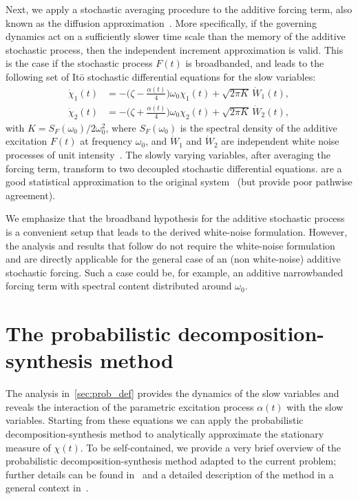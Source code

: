 \documentclass[3p]{elsarticle}
\begin{document}
Next, we apply a stochastic averaging procedure to the additive forcing term, also known as the diffusion approximation~\cite{Lin_Cai95, Klyatskin05, sapsis_PEM11}. More specifically, if the governing dynamics  act on a sufficiently slower time scale than the memory of the additive stochastic process, then the independent increment approximation is valid. This is the case if the stochastic process $F(t)$ is broadbanded, and leads to the following  set of It\={o} stochastic differential equations for the slow variables:
\begin{align}\label{eq:ouProcAvedx1}
    \dot \chi_1(t) &= -\biggl( \zeta  -\frac{ \alpha(t) }{4} \biggr)\omega_0  \chi_1(t) +\sqrt{2 \pi K } \, \dot W_1(t),\\
    \dot \chi_2(t) &= -\biggl( \zeta  + \frac{ \alpha(t)}{4} \biggr)\omega_0  \chi_2(t) +\sqrt{2 \pi K } \, \dot W_2(t),\label{eq:ouProcAvedx2}
\end{align}
with $K =S_{F}(\omega_0)/ 2 \omega_0^2$, where $S_{F}(\omega_0)$ is the spectral density of the additive excitation $F(t)$ at frequency $\omega_0$, and $\dot W_1$ and $\dot W_2$ are independent white noise processes of unit intensity~\cite{Lin_Cai95}. The slowly varying variables, after averaging the forcing term, transform to two decoupled stochastic differential equations.  are a good statistical approximation  to the original system~ (but provide poor pathwise agreement). 

We emphasize that the broadband hypothesis for the additive stochastic process is a convenient setup that leads to the derived white-noise formulation. However, the analysis and results that follow do not require the white-noise formulation and are directly applicable for the general case of an (non white-noise) additive stochastic forcing. Such a case could be, for example, an additive narrowbanded forcing term with spectral content distributed around $\omega_0$. 

\section{The probabilistic decomposition-synthesis method}\label{sec:PDSmethod}

The analysis in~\cref{sec:prob_def} provides  the dynamics of the slow variables and  reveals the  interaction of  the parametric excitation process $\alpha(t)$ with the slow variables. Starting from these equations we can apply the  probabilistic decomposition-synthesis method to analytically approximate the stationary measure of $\chi(t)$. To be self-contained,  we provide a very brief overview  of the probabilistic decomposition-synthesis method adapted to the current problem; further details can be found in~\cite{mohamad2015}  and a detailed description of the method in a general context in~\cite{mohamad2016}.
\end{document}

